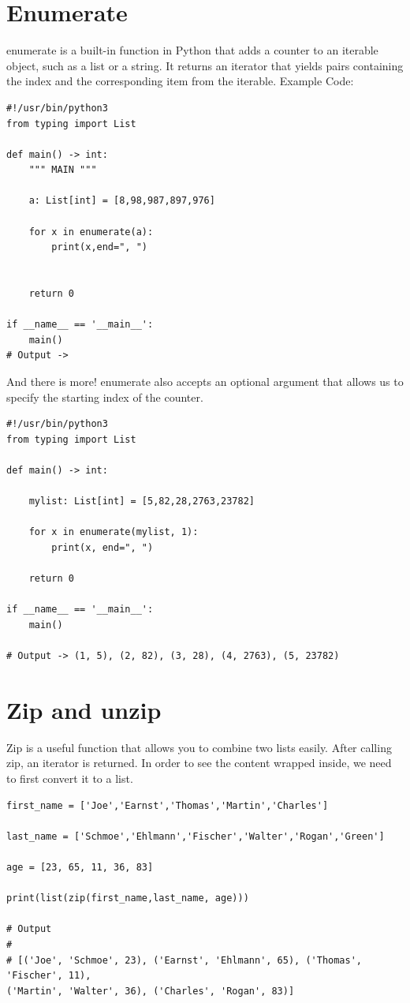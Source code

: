 \documentclass{report}
\begin{document}
    \pagebreak \bigbreak \noindent \section{Enumerate}
    \bigbreak \noindent
    enumerate is a built-in function in Python that adds a counter to an iterable object, such as a list or a string. It returns an iterator that yields pairs containing the index and the corresponding item from the iterable.
    \bigbreak \noindent 
    Example Code:
    \begin{verbatim}
#!/usr/bin/python3
from typing import List

def main() -> int:
    """ MAIN """

    a: List[int] = [8,98,987,897,976]

    for x in enumerate(a):
        print(x,end=", ")
    

    return 0

if __name__ == '__main__':
    main()
# Output -> 
    \end{verbatim}
    And there is more! enumerate also accepts an optional argument that allows us to specify the starting index of the counter.
    \bigbreak \noindent 
    \begin{verbatim}
#!/usr/bin/python3
from typing import List

def main() -> int:

    mylist: List[int] = [5,82,28,2763,23782]

    for x in enumerate(mylist, 1):
        print(x, end=", ")

    return 0

if __name__ == '__main__':
    main()

# Output -> (1, 5), (2, 82), (3, 28), (4, 2763), (5, 23782)
    \end{verbatim}


    \pagebreak \bigbreak \noindent \section{Zip and unzip}
    \bigbreak \noindent
    Zip is a useful function that allows you to combine two lists easily.
    \bigbreak \noindent 
    After calling zip, an iterator is returned. In order to see the content wrapped inside, we need to first convert it to a list.
    \begin{verbatim}
first_name = ['Joe','Earnst','Thomas','Martin','Charles']

last_name = ['Schmoe','Ehlmann','Fischer','Walter','Rogan','Green']

age = [23, 65, 11, 36, 83]

print(list(zip(first_name,last_name, age)))

# Output
#
# [('Joe', 'Schmoe', 23), ('Earnst', 'Ehlmann', 65), ('Thomas', 'Fischer', 11),
('Martin', 'Walter', 36), ('Charles', 'Rogan', 83)]
    \end{verbatim}
\end{document}
